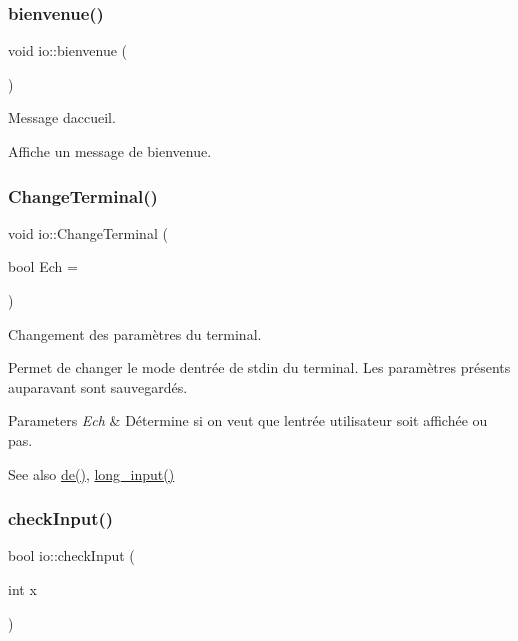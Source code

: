 \subsubsection{\texorpdfstring{bienvenue()}{bienvenue()}}
{\footnotesize\ttfamily void io\+::bienvenue (\begin{DoxyParamCaption}{ }\end{DoxyParamCaption})}



Message d\textquotesingle{}accueil. 

Affiche un message de bienvenue. \mbox{\label{namespaceio_ac0223d0ecfee82d8cc86543604173b73}} 
\subsubsection{\texorpdfstring{Change\+Terminal()}{ChangeTerminal()}}
{\footnotesize\ttfamily void io\+::\+Change\+Terminal (\begin{DoxyParamCaption}\item[{bool}]{Ech = {} }\end{DoxyParamCaption})}



Changement des paramètres du terminal. 

Permet de changer le mode d\textquotesingle{}entrée de stdin du terminal. Les paramètres présents auparavant sont sauvegardés.


\begin{DoxyParams}{Parameters}
{\em Ech} & Détermine si on veut que l\textquotesingle{}entrée utilisateur soit affichée ou pas. \\
\hline
\end{DoxyParams}
\begin{DoxySeeAlso}{See also}
\hyperlink{namespaceio_ae9908b55f26f07e78043d7cfad003d22}{de()}, \hyperlink{namespaceio_ab044be3afd7ac04eeb1a496af0f1d5c6}{long\+\_\+input()} 
\end{DoxySeeAlso}
\mbox{\label{namespaceio_ac79ddb3191a9d00d007eb48deb315942}} 
\subsubsection{\texorpdfstring{check\+Input()}{checkInput()}}
{\footnotesize\ttfamily bool io\+::check\+Input (\begin{DoxyParamCaption}\item[{int}]{x }\end{DoxyParamCaption})}




